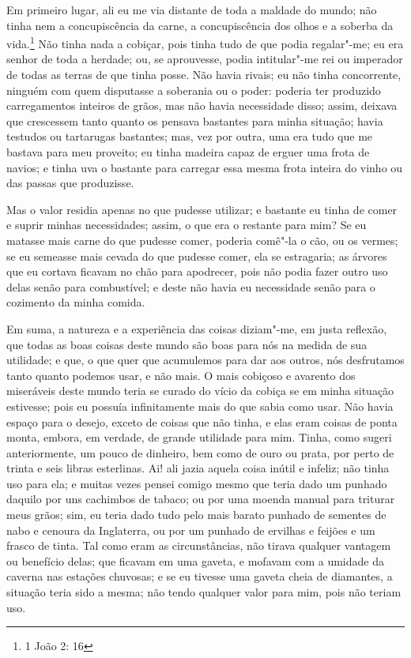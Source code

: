 Em primeiro lugar, ali eu me via distante de toda a maldade do mundo;
não tinha nem a concupiscência da carne, a concupiscência dos olhos e a
soberba da vida.\footnote{1 João 2: 16} Não tinha nada a cobiçar, pois
tinha tudo de que podia regalar"-me; eu era senhor de toda a herdade; ou,
se aprouvesse, podia intitular"-me rei ou imperador de todas as terras de
que tinha posse. Não havia rivais; eu não tinha concorrente, ninguém com
quem disputasse a soberania ou o poder: poderia ter produzido
carregamentos inteiros de grãos, mas não havia necessidade disso; assim,
deixava que crescessem tanto quanto os pensava bastantes para minha
situação; havia testudos ou tartarugas bastantes; mas, vez por outra,
uma era tudo que me bastava para meu proveito; eu tinha madeira capaz de
erguer uma frota de navios; e tinha uva o bastante para carregar essa
mesma frota inteira do vinho ou das passas que produzisse.

Mas o valor residia apenas no que pudesse utilizar; e bastante eu tinha
de comer e suprir minhas necessidades; assim, o que era o restante para
mim? Se eu matasse mais carne do que pudesse comer, poderia comê"-la o
cão, ou os vermes; se eu semeasse mais cevada do que pudesse comer, ela
se estragaria; as árvores que eu cortava ficavam no chão para apodrecer,
pois não podia fazer outro uso delas senão para combustível; e deste não
havia eu necessidade senão para o cozimento da minha comida.

Em suma, a natureza e a experiência das coisas diziam"-me, em justa
reflexão, que todas as boas coisas deste mundo são boas para nós na
medida de sua utilidade; e que, o que quer que acumulemos para dar aos
outros, nós desfrutamos tanto quanto podemos usar, e não mais. O mais
cobiçoso e avarento dos miseráveis deste mundo teria se curado do vício
da cobiça se em minha situação estivesse; pois eu possuía infinitamente
mais do que sabia como usar. Não havia espaço para o desejo, exceto de
coisas que não tinha, e elas eram coisas de ponta monta, embora, em
verdade, de grande utilidade para mim. Tinha, como sugeri anteriormente,
um pouco de dinheiro, bem como de ouro ou prata, por perto de trinta e
seis libras esterlinas. Ai! ali jazia aquela coisa inútil e infeliz; não
tinha uso para ela; e muitas vezes pensei comigo mesmo que teria dado um
punhado daquilo por uns cachimbos de tabaco; ou por uma moenda manual
para triturar meus grãos; sim, eu teria dado tudo pelo mais barato
punhado de sementes de nabo e cenoura da Inglaterra, ou por um punhado
de ervilhas e feijões e um frasco de tinta. Tal como eram as
circunstâncias, não tirava qualquer vantagem ou benefício delas; que
ficavam em uma gaveta, e mofavam com a umidade da caverna nas estações
chuvosas; e se eu tivesse uma gaveta cheia de diamantes, a situação
teria sido a mesma; não tendo qualquer valor para mim, pois não teriam
uso.

